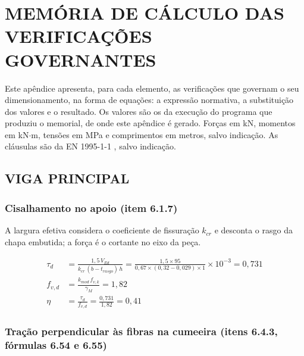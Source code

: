 
\chapter{MEMÓRIA DE CÁLCULO DAS VERIFICAÇÕES GOVERNANTES}\label{ap:memoria-calculo}
\allowdisplaybreaks[1]

Este apêndice apresenta, para cada elemento, as verificações que governam o seu dimensionamento, na forma de equações: a expressão normativa, a substituição dos valores e o resultado. Os valores são os da execução do programa que produziu o memorial, de onde este apêndice é gerado. Forças em kN, momentos em kN$\cdot$m, tensões em MPa e comprimentos em metros, salvo indicação. As cláusulas são da EN 1995-1-1 \cite{EN1995-1-1:2004}, salvo indicação.

\section{VIGA PRINCIPAL}\label{sec:mem-viga}

\subsection*{Cisalhamento no apoio (item 6.1.7)}

A largura efetiva considera o coeficiente de fissuração $k_{cr}$ e desconta o rasgo da chapa embutida; a força é o cortante no eixo da peça.

\begin{align}
    \tau_d &= \frac{1{,}5\,V_{Ed}}{k_{cr}\,(b - t_{rasgo})\,h} = \frac{1{,}5 \times 95}{0{,}67 \times (0{,}32 - 0{,}029) \times 1} \times 10^{-3} = 0{,}731 \nonumber \\
    f_{v,d} &= \frac{k_{mod}\,f_{v,k}}{\gamma_M} = 1{,}82 \nonumber \\
    \eta &= \frac{\tau_d}{f_{v,d}} = \frac{0{,}731}{1{,}82} = 0{,}41
    \label{eq:mem-cisalhamento}
\end{align}
\subsection*{Tração perpendicular às fibras na cumeeira (itens 6.4.3, fórmulas 6.54 e 6.55)}

